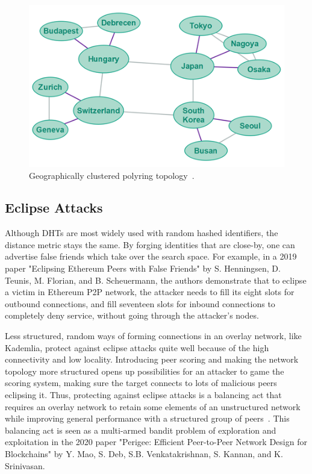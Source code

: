 \begin{figure}
	\includegraphics[width=\textwidth]{pictures/geographical-polyring.png}
	\caption{Geographically clustered polyring topology~\cite{Jenkov_undated-kl}.}
	\label{Geographical Polyring}
\end{figure}


\subsection{Eclipse Attacks}
Although DHTs are most widely used with random hashed identifiers, the distance metric stays the same. By forging identities that are close-by, one can advertise false friends which take over the search space. For example, in a 2019 paper "Eclipsing Ethereum Peers with False Friends" by S. Henningsen, D. Teunis, M. Florian, and B. Scheuermann, the authors demonstrate that to eclipse a victim in Ethereum P2P network, the attacker needs to fill its eight slots for outbound connections, and fill seventeen slots for inbound connections to completely deny service, without going through the attacker's nodes.~\cite{Henningsen2019-mf}

Less structured, random ways of forming connections in an overlay network, like Kademlia, protect against eclipse attacks quite well because of the high connectivity and low locality. Introducing peer scoring and making the network topology more structured opens up possibilities for an attacker to game the scoring system, making sure the target connects to lots of malicious peers eclipsing it. Thus, protecting against eclipse attacks is a balancing act that requires an overlay network to retain some elements of an unstructured network while improving general performance with a structured group of peers~\cite{Mao2020-ee}. This balancing act is seen as a multi-armed bandit problem of exploration and exploitation in the 2020 paper "Perigee: Efficient Peer-to-Peer Network Design for Blockchains" by Y. Mao, S. Deb, S.B. Venkatakrishnan, S. Kannan, and K. Srinivasan.

